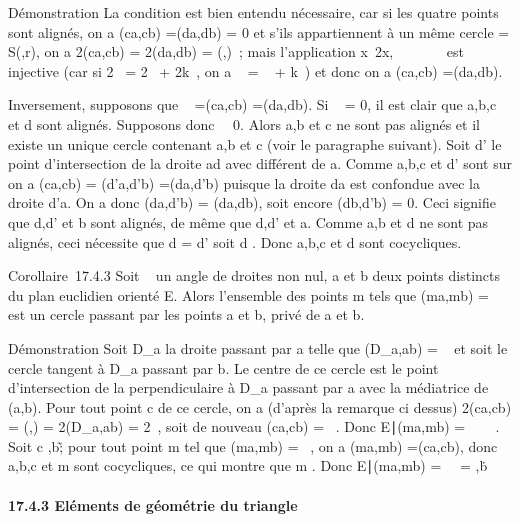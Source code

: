 \documentclass[]{article}
\begin{document}
Démonstration La condition est bien entendu nécessaire, car si les
quatre points sont alignés, on a \widehat(ca,cb)
=\widehat (da,db) = 0 et s'ils appartiennent à un
même cercle \Gamma = S(\omega,r), on a 2\widehat(ca,cb) =
2\widehat(da,db) =\widehat
(\overrightarrow\omegaa,\overrightarrow\omegab)~;
mais l'application x\mapsto~2x, ~\diagup\pi~ \rightarrow~ ~\pi~ est
injective (car si 2\alpha~ = 2\beta~ + 2k\pi~, on a \alpha~ = \beta~ + k\pi~) et donc on a
\widehat(ca,cb) =\widehat (da,db).

Inversement, supposons que \alpha~ =\widehat (ca,cb)
=\widehat (da,db). Si \alpha~ = 0, il est clair que a,b,c
et d sont alignés. Supposons donc \alpha~\neq~0. Alors
a,b et c ne sont pas alignés et il existe un unique cercle \Gamma contenant
a,b et c (voir le paragraphe suivant). Soit d' le point d'intersection
de la droite ad avec \Gamma différent de a. Comme a,b,c et d' sont sur \Gamma on a
\widehat(ca,cb) =\widehat
(d'a,d'b) =\widehat (da,d'b) puisque la droite da
est confondue avec la droite d'a. On a donc
\widehat(da,d'b) =\widehat
(da,db), soit encore \widehat(db,d'b) = 0. Ceci
signifie que d,d' et b sont alignés, de même que d,d' et a. Comme a,b et
d ne sont pas alignés, ceci nécessite que d = d' soit d \in \Gamma. Donc a,b,c
et d sont cocycliques.

Corollaire~17.4.3 Soit \alpha~ un angle de droites non nul, a et b deux points
distincts du plan euclidien orienté E. Alors l'ensemble des points m
tels que \widehat(ma,mb) = \alpha~ est un cercle passant
par les points a et b, privé de a et b.

Démonstration Soit D_a la droite passant par a telle que
\widehat(D_a,ab) = \alpha~ et soit \Gamma le cercle
tangent à D_a passant par b. Le centre \omega de ce cercle est le
point d'intersection de la perpendiculaire à D_a passant par a
avec la médiatrice de (a,b). Pour tout point c de ce cercle, on a
(d'après la remarque ci dessus) 2\widehat(ca,cb)
=\widehat
(\overrightarrow\omegaa,\overrightarrow\omegab)
= 2\widehat(D_a,ab) = 2\alpha~, soit de nouveau
\widehat(ca,cb) = \alpha~. Donc \m \in
E∣\widehat(ma,mb) =
\alpha~\ \subset~ \Gamma. Soit c \in \Gamma
\diagdown\a,b\~; pour tout point m tel que
\widehat(ma,mb) = \alpha~, on a
\widehat(ma,mb) =\widehat (ca,cb),
donc a,b,c et m sont cocycliques, ce qui montre que m \in \Gamma. Donc
\m \in
E∣\widehat(ma,mb) =
\alpha~\ = \Gamma \diagdown\a,b\.

\paragraph{17.4.3 Eléments de géométrie du triangle}
\end{document}
